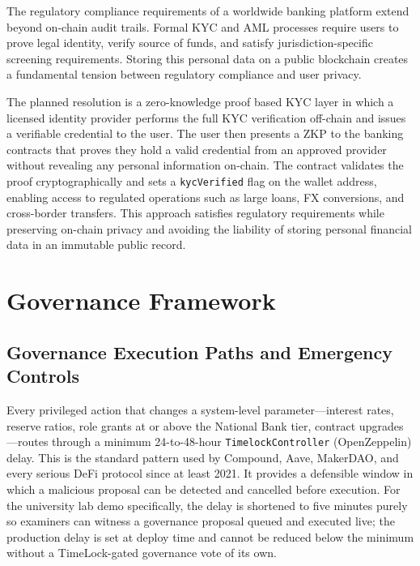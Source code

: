 \documentclass[12pt,a4paper]{report}
\begin{document}
The regulatory compliance requirements of a worldwide banking platform extend beyond on-chain audit trails. Formal KYC and AML processes require users to prove legal identity, verify source of funds, and satisfy jurisdiction-specific screening requirements. Storing this personal data on a public blockchain creates a fundamental tension between regulatory compliance and user privacy.

The planned resolution is a zero-knowledge proof based KYC layer in which a licensed identity provider performs the full KYC verification off-chain and issues a verifiable credential to the user. The user then presents a ZKP to the banking contracts that proves they hold a valid credential from an approved provider without revealing any personal information on-chain. The contract validates the proof cryptographically and sets a \texttt{kycVerified} flag on the wallet address, enabling access to regulated operations such as large loans, FX conversions, and cross-border transfers. This approach satisfies regulatory requirements while preserving on-chain privacy and avoiding the liability of storing personal financial data in an immutable public record.


\section{Governance Framework}
\label{sec:governance-framework}

\subsection{Governance Execution Paths and Emergency Controls}
\label{sec:governance-dual-path}

Every privileged action that changes a system-level parameter---interest rates, reserve ratios, role grants at or above the National Bank tier, contract upgrades---routes through a minimum 24-to-48-hour \texttt{TimelockController} (OpenZeppelin) delay. This is the standard pattern used by Compound, Aave, MakerDAO, and every serious DeFi protocol since at least 2021. It provides a defensible window in which a malicious proposal can be detected and cancelled before execution. For the university lab demo specifically, the delay is shortened to five minutes purely so examiners can witness a governance proposal queued and executed live; the production delay is set at deploy time and cannot be reduced below the minimum without a TimeLock-gated governance vote of its own.
\end{document}
